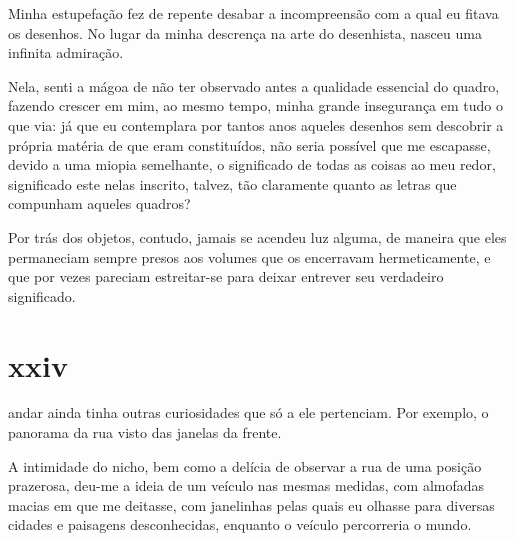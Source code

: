 
Minha estupefação fez de repente desabar a incompreensão com a qual eu fitava
os desenhos. No lugar da minha descrença na arte do desenhista, nasceu uma
infinita admiração.

Nela, senti a mágoa de não ter observado antes a qualidade essencial do
quadro, fazendo crescer em mim, ao mesmo tempo, minha grande insegurança em
tudo o que via: já que eu contemplara por tantos anos aqueles desenhos sem
descobrir a própria matéria de que eram constituídos, não seria possível que
me escapasse, devido a uma miopia semelhante, o significado de todas as
coisas ao meu redor, significado este nelas inscrito, talvez, tão claramente
quanto as letras que compunham aqueles quadros?


Por trás dos objetos, contudo, jamais se acendeu luz alguma, de maneira que
eles permaneciam sempre presos aos volumes que os encerravam hermeticamente,
e que por vezes pareciam estreitar-se para deixar entrever seu verdadeiro
significado.

\section{xxiv} 

 andar ainda tinha outras curiosidades que só a ele
 pertenciam. Por exemplo, o panorama da rua visto das janelas da frente.



A intimidade do nicho, bem como a delícia de observar a rua de uma posição
prazerosa, deu-me a ideia de um veículo nas mesmas medidas, com almofadas
macias em que me deitasse, com janelinhas pelas quais eu olhasse para
diversas cidades e paisagens desconhecidas, enquanto o veículo percorreria o
mundo.

